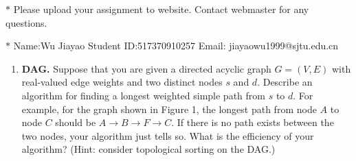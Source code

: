 \documentclass[12pt,a4paper]{article}
\theoremstyle{definition}
\begin{document}
\noindent

\noindent{}
\begin{center}
\footnotesize{\color{red}$*$ Please upload your assignment to website. Contact webmaster for any questions.}

\footnotesize{\color{blue}$*$ Name:Wu Jiayao \quad Student ID:517370910257 \quad Email: jiayaowu1999@sjtu.edu.cn}
\end{center}


\begin{enumerate}

\item \textbf{DAG.} Suppose that you are given a directed acyclic graph $G=(V,E)$ with real-valued edge weights and two distinct nodes $s$ and $d$. Describe an algorithm for finding a longest weighted simple path from $s$ to $d$. For example, for the graph shown in Figure 1, the longest path from node $A$ to node $C$ should be $A \rightarrow B \rightarrow F \rightarrow C$. If there is no path exists between the two nodes, your algorithm just tells so. What is the efficiency of your algorithm? (Hint: consider topological sorting on the DAG.)


\end{enumerate}
\end{document}
